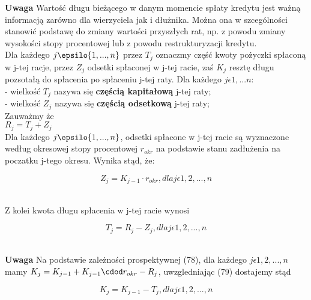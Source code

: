 \documentclass{article}
\begin{document}
\textbf{Uwaga} Wartość długu bieżącego w danym momencie spłaty kredytu jest ważną informacją zarówno dla wierzyciela jak i dłużnika. Można ona w szcególności stanowić podstawę do zmiany wartości przyszłych rat, np. z powodu zmiany wysokości stopy procentowej lub z powodu restrukturyzacji kredytu.\\

Dla każdego $ j \epsilo {1,...,n} $ przez $ T_j $ oznaczmy część kwoty pożyczki spłaconą w j-tej racje, przez $ Z_j $ odsetki spłaconej w j-tej racie, zaś $ K_j $ resztę długu pozsotałą do spłacenia po spłaceniu j-tej raty. Dla każdego $ j \epsilon {1,...n} $: \\

- wielkość $ T_j $ nazywa się \textbf{częścią kapitałową} j-tej raty;\\
- wielkość $ Z_j $ nazywa się \textbf{częścią odsetkową} j-tej raty;\\

Zauważmy że \\

$ R_j = T_j + Z_j $\\

Dla każdego $ j \epsilo {1,...,n} $, odsetki spłacone w j-tej racie są wyznaczone według okresowej stopy procentowej $ r_{okr} $ na podstawie stanu zadłużenia na poczatku j-tego okresu. Wynika stąd, że:

\begin{center}
	\begin{equation}
		Z_j = K_{j-1} \cdot r_{okr}, dla j \epsilon{1,2,...,n}
	\end{equation}
\end{center}\\

Z kolei kwota długu spłacenia w j-tej racie wynosi

\begin{center}
	\begin{equation}
		T_j = R_j - Z_j, dla j \epsilon{1,2,...,n}
	\end{equation}
\end{center}\\

\textbf{Uwaga} Na podstawie zależności prospektywnej (78), dla każdego $ j \epsilon{1,2,...,n} $ mamy $ K_j = K_{j-1} + K_{j-1} \cdod r_{okr} - R_j $, uwzgledniając (79) dostajemy stąd

\begin{center}
	\begin{equation}
		K_j = K_{j-1} - T_j, dla j \epsilon{1,2,...,n}
	\end{equation}
\end{center}\\
\end{document}
